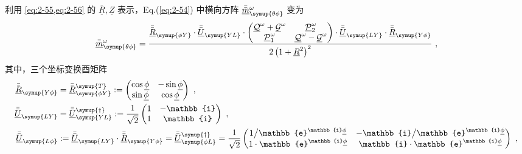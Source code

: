 利用 \cref{eq:2-55,eq:2-56} 的 $\bar{\underline{R}}, \underline{Z}$ 表示，Eq.(\ref{eq:2-54}) 中横向方阵 $\bar{\bar{\underline{m}}}^{\omega}_{\symup{\theta\phi}}$ 变为
\begin{equation} \label{eq:2-58}
	\abovedisplayskip=10pt
	\bar{\bar{\underline{m}}}^{\omega}_{\symup{\theta\phi}} =  \frac{\bar{\bar{\underline{R}}}_{\symup{\phi Y}} \cdot \bar{\bar{\underline{U}}}_{\symup{YL}} \cdot \begin{pmatrix} \underline{\mathcal{Q}}^{\omega} + \underline{\mathcal{G}}^{\omega} & \underline{\mathcal{P}}^{\omega}_{2} \\ \underline{\mathcal{P}}^{\omega}_{1} & \underline{\mathcal{Q}}^{\omega} - \underline{\mathcal{G}}^{\omega} \end{pmatrix} \cdot \bar{\bar{\underline{U}}}_{\symup{LY}} \cdot \bar{\bar{\underline{R}}}_{\symup{Y\phi}}}{2\left(1+\underline{R}^{2}\right)^{2}} ~,
\end{equation}
其中，三个坐标变换酉矩阵
\begin{subequations} \label{eq:2-59}
	\begin{align}
		\bar{\bar{\underline{R}}}_{\symup{Y \phi}} &= \bar{\bar{\underline{R}}}_{\symup{\phi Y}}^{\symup{T}} := \begin{pmatrix} \cos{\underline{\phi}} & - \sin{\underline{\phi}} \\ \sin{\underline{\phi}} & \cos{\underline{\phi}} \end{pmatrix} \label{eq:2-59a}~,\\ \bar{\bar{\underline{U}}}_{\symup{LY}} &= \bar{\bar{\underline{U}}}_{\symup{YL}}^{\symup{\dag}} := \frac{1}{\sqrt{2}} \begin{pmatrix} 1 & - \mathbb{i} \\ 1 & \mathbb{i} \end{pmatrix} \label{eq:2-59b}~,\\ \bar{\bar{\underline{U}}}_{\symup{L \phi}} &:= \bar{\bar{\underline{U}}}_{\symup{LY}} \cdot \bar{\bar{\underline{R}}}_{\symup{Y \phi}} = \bar{\bar{\underline{U}}}_{\symup{\phi L}}^{\symup{\dag}} = \frac{1}{\sqrt{2}} \begin{pmatrix} 1 \big/ \mathbb{e}^{\mathbb{i}\underline{\phi}} & -\mathbb{i} \big/ \mathbb{e}^{\mathbb{i}\underline{\phi}} \\ 1 \cdot \mathbb{e}^{\mathbb{i}\underline{\phi}} & \mathbb{i} \cdot \mathbb{e}^{\mathbb{i}\underline{\phi}} \end{pmatrix} \label{eq:2-59c}~,
	\end{align}
\end{subequations}

